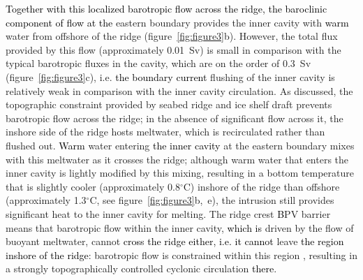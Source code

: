 \documentclass[draft]{agujournal2019}
\newcommand{\rout}[1]{\red{\st{#1}}}\newcommand{\ab}[1]{\textcolor{Green}{#1}}\newcommand{\about}[1]{\textcolor{Cyan}{\sout{#1}}}
\newcommand{\blue}[1]{\textcolor{blue}{#1}}
\newcommand{\red}[1]{\textcolor{red}{#1}}
\renewcommand{\rout}[1]{{}} %
\renewcommand{\blue}[1]{{\textcolor{black}{#1}}} %
\renewcommand{\red}[1]{{}} %
\begin{document}
\blue{Together with this localized barotropic flow across the ridge, the baroclinic component of flow at the}\rout{The} eastern boundary \rout{current }provides the inner cavity with \blue{warm }water from offshore of the ridge (figure~\ref{fig:figure3}b). However, the total flux provided by this flow (approximately 0.01~Sv) is small in comparison with the typical barotropic fluxes in the cavity, which are on the order of 0.3~Sv  (figure~\ref{fig:figure3}c), i.e. \rout{this}\blue{the boundary current} flushing of the inner cavity is relatively weak in comparison with the inner cavity circulation. As discussed, the topographic constraint provided by seabed ridge and ice shelf draft prevents barotropic flow across the ridge; in the absence of significant flow across it, the inshore side of the ridge hosts meltwater, which is recirculated rather than flushed out. \blue{Warm} water entering \blue{the inner cavity} at the eastern boundary mixes with this meltwater as it crosses the ridge; although warm water that enters the inner cavity is lightly modified by this mixing, resulting in a bottom temperature that is slightly cooler (approximately 0.8${}^\circ$C) inshore of the ridge than offshore (approximately 1.3${}^\circ$C, see figure~\ref{fig:figure3}b,~e), the intrusion still provides significant heat to the inner cavity for melting. The ridge crest \blue{B}PV barrier means that barotropic flow within the inner cavity, \blue{which is} driven by the flow of buoyant meltwater, cannot \blue{cross the ridge either, i.e. it cannot} leave \rout{either}\blue{the region inshore of the ridge}: barotropic flow is constrained within this region \rout{cavity}, resulting in a strongly topographically controlled cyclonic circulation \rout{inshore of the ridge}\blue{there}.
\end{document}
